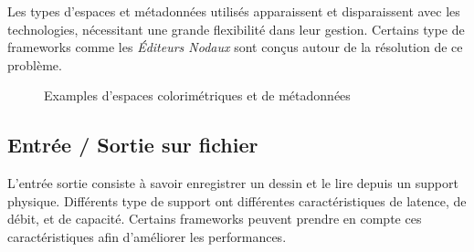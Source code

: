 				Les types d'espaces et métadonnées utilisés apparaissent et disparaissent avec les technologies, nécessitant une grande flexibilité
				dans leur gestion. Certains type de frameworks comme les \emph{Éditeurs Nodaux} sont conçus autour de la résolution de ce problème.  

				\begin{figure}[h]
					\centering
					\caption{Examples d'espaces colorimétriques et de métadonnées}
					\label{fig:color}
				\end{figure}

		\subsection{Entrée / Sortie sur fichier}
			L'entrée sortie consiste à savoir enregistrer un dessin et le lire depuis un support physique. Différents type de support ont
			différentes caractéristiques de latence, de débit, et de capacité. Certains frameworks peuvent prendre en compte ces caractéristiques afin
			d'améliorer les performances.  
